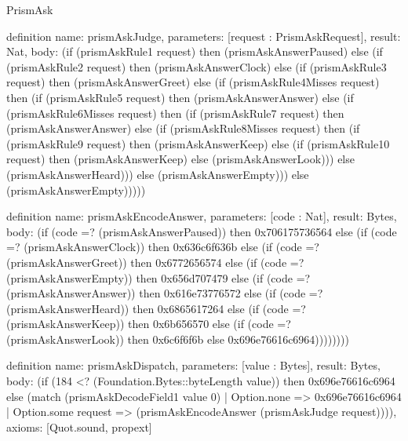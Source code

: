 \begin{lexlean}{PrismAsk}
\begin{semanticmodule}
definition{
  name: prismAskJudge,
  parameters: [request : PrismAskRequest],
  result: Nat,
  body: (if (prismAskRule1 request) then (prismAskAnswerPaused) else (if (prismAskRule2 request) then (prismAskAnswerClock) else (if (prismAskRule3 request) then (prismAskAnswerGreet) else (if (prismAskRule4Misses request) then (if (prismAskRule5 request) then (prismAskAnswerAnswer) else (if (prismAskRule6Misses request) then (if (prismAskRule7 request) then (prismAskAnswerAnswer) else (if (prismAskRule8Misses request) then (if (prismAskRule9 request) then (prismAskAnswerKeep) else (if (prismAskRule10 request) then (prismAskAnswerKeep) else (prismAskAnswerLook))) else (prismAskAnswerHeard))) else (prismAskAnswerEmpty))) else (prismAskAnswerEmpty)))))
}

definition{
  name: prismAskEncodeAnswer,
  parameters: [code : Nat],
  result: Bytes,
  body: (if (code =? (prismAskAnswerPaused)) then 0x706175736564 else (if (code =? (prismAskAnswerClock)) then 0x636c6f636b else (if (code =? (prismAskAnswerGreet)) then 0x6772656574 else (if (code =? (prismAskAnswerEmpty)) then 0x656d707479 else (if (code =? (prismAskAnswerAnswer)) then 0x616e73776572 else (if (code =? (prismAskAnswerHeard)) then 0x6865617264 else (if (code =? (prismAskAnswerKeep)) then 0x6b656570 else (if (code =? (prismAskAnswerLook)) then 0x6c6f6f6b else 0x696e76616c6964))))))))
}

definition{
  name: prismAskDispatch,
  parameters: [value : Bytes],
  result: Bytes,
  body: (if (184 <? (Foundation.Bytes::byteLength value)) then 0x696e76616c6964 else (match (prismAskDecodeField1 value 0)
    | Option.none => 0x696e76616c6964
    | Option.some request => (prismAskEncodeAnswer (prismAskJudge request)))),
  axioms: [Quot.sound, propext]
}
\end{semanticmodule}
\end{lexlean}

